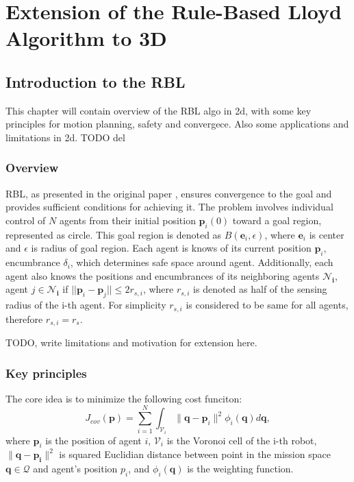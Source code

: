 \chapter{Extension of the Rule-Based Lloyd Algorithm to 3D\label{chap:rbl}}

\section{Introduction to the RBL}

This chapter will contain overview of the RBL algo in 2d, with some key principles for motion planning, safety and convergece. Also some applications and limitations in 2d. TODO del

    \subsection{Overview}

        RBL, as presented in the original paper \cite{rbl_paper}, ensures convergence to the goal and provides sufficient conditions for achieving it. 
        The problem involves individual control of $N$ agents from their initial position $\mathbf{p}_i(0)$ toward a goal region, represented as circle.
        This goal region is denoted as $B(\mathbf{e}_i, \epsilon)$, where $\mathbf{e}_i$ is center and $\epsilon$ is radius of goal region.
        Each agent is knows of its current position $\mathbf{p}_i$, encumbrance $\delta_i$, which determines safe space around agent.
        Additionally, each agent also knows the positions and encumbrances of its neighboring agents $\mathbf{\mathcal{N}_i}$, agent $j \in \mathbf{\mathcal{N}_i}$ if $||\mathbf{p}_i - \mathbf{p}_j|| \leq 2r_{s,i}$, where $r_{s,i}$ is denoted as half of the sensing radius of the i-th agent.
        For simplicity $r_{s,i}$ is considered to be same for all agents, therefore $r_{s,i} = r_s$. 

        TODO, write limitations and motivation for extension here.

    \subsection{Key principles}

        The core idea is to minimize the following cost funciton: 
        \begin{equation}
            J_{cov}(\mathbf{p}) = \sum_{i=1}^{N} \int_{\mathcal{V}_i} \lVert\mathbf{q}-\mathbf{p}_i\rVert^2 \phi_i (\mathbf{q})d\mathbf{q},
            \label{coverage_cost_function}
        \end{equation}
        where $\mathbf{p}_i$ is the position of agent $i$, $\mathcal{V}_i$ is the Voronoi cell of the i-th robot, $\lVert\mathbf{q}-\mathbf{p_i}\rVert^2$ is squared Euclidian distance between point in the mission space $\mathbf{q} \in \mathcal{Q}$ and agent's position $p_i$, 
        and $\phi_i (\mathbf{q})$ is the weighting function.

